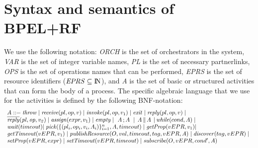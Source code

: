 \section{Syntax and semantics of BPEL+RF}\label{ops}
We use the following notation: {\it ORCH} is the set of orchestrators in the system, {\it VAR} is the set of integer variable names, {\it PL} is the set of necessary partnerlinks, {\it OPS} is the set of operations names that can be performed, {\it EPRS} is the set of resource identifiers (${\it EPRS\subseteq{\rm I\! N}}$), and {\it A} is the set of basic or structured activities that can form the body of a process. The specific algebraic language that we use
for the activities is defined by the following BNF-notation:
%
\[\begin{array}{l}
  A ::=  {\it throw} \;|\;           %
         {\it receive}(pl,op,v) \;|\;  %
         {\it invoke}(pl,op,v_1) \;|\;
         {\it exit}\;|\;
         {\it reply}(pl,op,v)\;|\;\\  %
         {\it \overline{reply}(pl,op,v_2)}\;|\;
         {\it assign}(expr,v_1) \;|\;
         {\it empty}\;|\;
         \,\,A \,; A \,\, \;|\, %
         \;A \,\| \, A \;\,|\,   %
         {\it while}(cond,A)\;|\ \\
         {\it wait}(timeout)\hspace{-0.1cm}\;|\;
         {\it pick}(\{(pl_i,op_i,v_i,A_i)\}_{i=1}^n,A,timeout)\;|\;
         {\it getProp}(vEPR,v_1)\hspace{-0.1cm}\;|\;\\
         {\it getTimeout}(vEPR,v_1)\;|\;
         {\it publishResource}(O,val,timeout,tag,vEPR,A)\;|\;
         {\it discover}(tag,vEPR)\;|\;\\
         {\it setProp}(vEPR,expr)\;|\;
         {\it setTimeout}(vEPR,timeout)\;|\;
         {\it subscribe}(O,vEPR,cond',A)
\end{array}
\]

